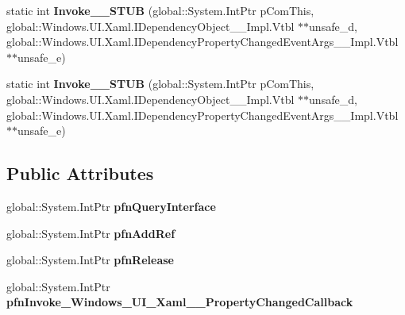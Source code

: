 \begin{DoxyCompactItemize}
\item 
\mbox{\label{struct_windows_1_1_u_i_1_1_xaml_1_1_property_changed_callback_____impl_1_1_vtbl_ae038e1ac1a4dfb3ad283674a8247ba70}} 
static int {\bfseries Invoke\+\_\+\+\_\+\+S\+T\+UB} (global\+::\+System.\+Int\+Ptr p\+Com\+This, global\+::\+Windows.\+U\+I.\+Xaml.\+I\+Dependency\+Object\+\_\+\+\_\+\+Impl.\+Vtbl $\ast$$\ast$unsafe\+\_\+d, global\+::\+Windows.\+U\+I.\+Xaml.\+I\+Dependency\+Property\+Changed\+Event\+Args\+\_\+\+\_\+\+Impl.\+Vtbl $\ast$$\ast$unsafe\+\_\+e)
\item 
\mbox{\label{struct_windows_1_1_u_i_1_1_xaml_1_1_property_changed_callback_____impl_1_1_vtbl_ae038e1ac1a4dfb3ad283674a8247ba70}} 
static int {\bfseries Invoke\+\_\+\+\_\+\+S\+T\+UB} (global\+::\+System.\+Int\+Ptr p\+Com\+This, global\+::\+Windows.\+U\+I.\+Xaml.\+I\+Dependency\+Object\+\_\+\+\_\+\+Impl.\+Vtbl $\ast$$\ast$unsafe\+\_\+d, global\+::\+Windows.\+U\+I.\+Xaml.\+I\+Dependency\+Property\+Changed\+Event\+Args\+\_\+\+\_\+\+Impl.\+Vtbl $\ast$$\ast$unsafe\+\_\+e)
\end{DoxyCompactItemize}
\subsection*{Public Attributes}
\begin{DoxyCompactItemize}
\item 
\mbox{\label{struct_windows_1_1_u_i_1_1_xaml_1_1_property_changed_callback_____impl_1_1_vtbl_a871bd8b21304e64bbcb8784adc50a2fe}} 
global\+::\+System.\+Int\+Ptr {\bfseries pfn\+Query\+Interface}
\item 
\mbox{\label{struct_windows_1_1_u_i_1_1_xaml_1_1_property_changed_callback_____impl_1_1_vtbl_a2ba015a048cf3a9a703ac48f577a11fb}} 
global\+::\+System.\+Int\+Ptr {\bfseries pfn\+Add\+Ref}
\item 
\mbox{\label{struct_windows_1_1_u_i_1_1_xaml_1_1_property_changed_callback_____impl_1_1_vtbl_a255f9946dc1a919083e76570952bbb7b}} 
global\+::\+System.\+Int\+Ptr {\bfseries pfn\+Release}
\item 
\mbox{\label{struct_windows_1_1_u_i_1_1_xaml_1_1_property_changed_callback_____impl_1_1_vtbl_a59cd54aa638a1b70526f2d2865b04175}} 
global\+::\+System.\+Int\+Ptr {\bfseries pfn\+Invoke\+\_\+\+Windows\+\_\+\+U\+I\+\_\+\+Xaml\+\_\+\+\_\+\+Property\+Changed\+Callback}
\end{DoxyCompactItemize}
